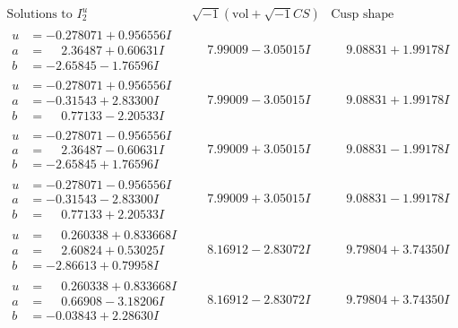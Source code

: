 \documentclass[1p]{elsarticle_modified}
\theoremstyle{definition}
\newcommand{\I}{\sqrt{-1}}
\begin{document}
$$\begin{array}{c|c|c}  
\text{Solutions to }I^u_{2}& \I (\text{vol} + \sqrt{-1}CS) & \text{Cusp shape}\\
 \hline 
\begin{aligned}
u &= -0.278071 + 0.956556 I \\
a &= \phantom{-}2.36487 + 0.60631 I \\
b &= -2.65845 - 1.76596 I\end{aligned}
 & \phantom{-}7.99009 - 3.05015 I & \phantom{-}9.08831 + 1.99178 I \\ \hline\begin{aligned}
u &= -0.278071 + 0.956556 I \\
a &= -0.31543 + 2.83300 I \\
b &= \phantom{-}0.77133 - 2.20533 I\end{aligned}
 & \phantom{-}7.99009 - 3.05015 I & \phantom{-}9.08831 + 1.99178 I \\ \hline\begin{aligned}
u &= -0.278071 - 0.956556 I \\
a &= \phantom{-}2.36487 - 0.60631 I \\
b &= -2.65845 + 1.76596 I\end{aligned}
 & \phantom{-}7.99009 + 3.05015 I & \phantom{-}9.08831 - 1.99178 I \\ \hline\begin{aligned}
u &= -0.278071 - 0.956556 I \\
a &= -0.31543 - 2.83300 I \\
b &= \phantom{-}0.77133 + 2.20533 I\end{aligned}
 & \phantom{-}7.99009 + 3.05015 I & \phantom{-}9.08831 - 1.99178 I \\ \hline\begin{aligned}
u &= \phantom{-}0.260338 + 0.833668 I \\
a &= \phantom{-}2.60824 + 0.53025 I \\
b &= -2.86613 + 0.79958 I\end{aligned}
 & \phantom{-}8.16912 - 2.83072 I & \phantom{-}9.79804 + 3.74350 I \\ \hline\begin{aligned}
u &= \phantom{-}0.260338 + 0.833668 I \\
a &= \phantom{-}0.66908 - 3.18206 I \\
b &= -0.03843 + 2.28630 I\end{aligned}
 & \phantom{-}8.16912 - 2.83072 I & \phantom{-}9.79804 + 3.74350 I \\ \hline\begin{aligned}

\end{aligned}
\end{array}$$
\end{document}
